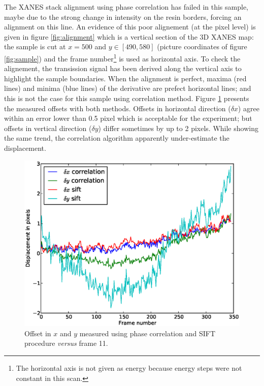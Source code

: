 \documentclass[preprint]{iucr}
\begin{document}
The XANES stack alignment using phase correlation has failed in this sample,
maybe due to the strong change in intensity on the resin borders, forcing an
alignment on this line. An evidence of this poor alignement (at the pixel
level) is given in figure \ref{fig:alignment} which is a vertical section of the
3D XANES map: the sample is cut at $x=500$ and $y\in[490, 580]$ (picture
coordinates of figure \ref{fig:sample}) and the frame number\footnote{The 
horizontal axis is not given as energy because energy steps were not
constant in this scan.} is used as horizontal axis.
To check the alignement, the transission signal has been derived along the
vertical axis to highlight the sample boundaries.
When the alignment is perfect, maxima (red lines) and minima (blue lines) of
the derivative are prefect horizontal lines; and this is not the case
for this sample using correlation method. Figure \ref{fig:offset}
presents the measured offsets with both methods. 
Offsets in horizontal direction ($\delta x$) agree within an error
lower than 0.5 pixel which is acceptable for the experiment; but offsets in
vertical direction ($\delta y$) differ sometimes by up to 2 pixels. While
showing the same trend, the correlation algorithm apparently under-estimate the
displacement.

\begin{figure}
\label{fig:offset}
\begin{center}
\includegraphics[width=15cm]{offset.eps}
\caption{Offset in $x$ and $y$ measured using phase correlation and SIFT
procedure \emph{versus} frame 11.}
\end{center}
\end{figure}
\end{document}
